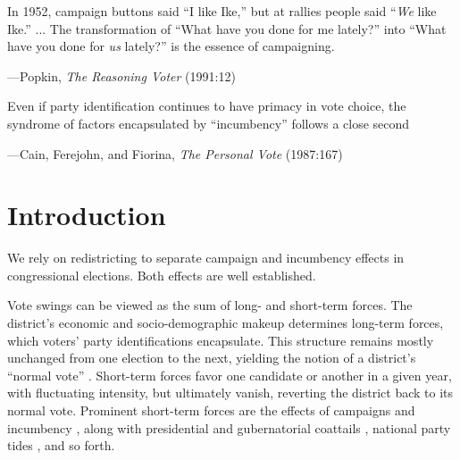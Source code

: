 \documentclass[letter,12pt]{article}
\begin{document}
\epigraph{
  In 1952, campaign buttons said ``I like Ike,'' but at rallies people said ``\emph{We} like Ike.'' ... The transformation of ``What have you done for me lately?'' into ``What have you done for \emph{us} lately?'' is the essence of campaigning.}{---Popkin, \emph{The Reasoning Voter} (1991:12)}

\epigraph{Even if party identification continues to have primacy in vote choice, the syndrome of factors encapsulated by ``incumbency'' follows a close second}{---Cain, Ferejohn, and Fiorina, \emph{The Personal Vote} (1987:167)}

\onehalfspacing

\section{Introduction}

We rely on redistricting to separate campaign and incumbency effects in congressional elections. Both effects are well established.

Vote swings can be viewed as the sum of long- and short-term forces. The district's economic and socio-demographic makeup determines long-term forces, which voters' party identifications encapsulate. This structure remains mostly unchanged from one election to the next, yielding the notion of a district's ``normal vote'' \citep{converse.1966}. Short-term forces favor one candidate or another in a given year, with fluctuating intensity, but ultimately vanish, reverting the district back to its normal vote. Prominent short-term forces are the effects of campaigns \citep{moreno.decisElec.2009,downs.1957,jacobson.1990spending} and incumbency \citep{mayhew1974vanishingMg,erikson1971incumbency,gelman.king.1991incumbency}, along with presidential \citep{ferejohn.calvert.1984} and gubernatorial coattails \citep{magar.gubCoatMx.2012}, national party tides \citep[][:104-7]{cox.mccubbins.2007leviath2nd}, and so forth. 
\end{document}
